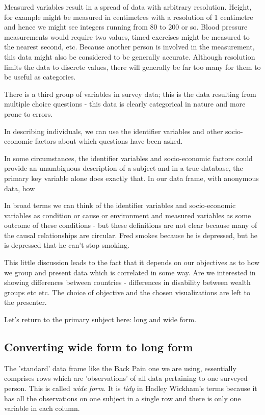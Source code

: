 \documentclass[titlepage]{book}\usepackage{knitr}
\begin{document}
Measured variables result in a spread of data with arbitrary resolution.  Height, for example might be measured in centimetres with a resolution of 1 centimetre and hence we might see integers running from 80 to 200 or so. Blood pressure measurements would require two values, timed exercises might be measured to the nearest second, etc.  Because another person is involved in the measurement, this data might also be considered to be generally accurate. Although resolution limits the data to discrete values, there will generally be far too many for them to be useful as categories.

There is a third group of variables in survey data; this is the data resulting from multiple choice questions - this data is clearly categorical in nature and more prone to errors.  

In describing individuals, we can use the identifier variables and other socio-economic factors about which questions have been asked. 

In some circumstances, the identifier variables and socio-economic factors could provide an unambiguous description of a subject and in a true database, the primary key variable alone does exactly that. In our data frame, with anonymous data,  how

In broad terms we can think of the identifier variables and socio-economic variables as condition or cause or environment and measured variables as some outcome of these conditions - but these definitions are not clear because many of the causal relationships are circular. Fred smokes because he is depressed, but he is depressed that he can't stop smoking.

This little discussion leads to the fact that it depends on our objectives as to how we group and present data which is correlated in some way. Are we interested in showing differences between countries - differences in disability between wealth groups etc etc.  The choice of objective and the chosen visualizations are left to the presenter.

Let's return to the primary subject here: long and wide form.

\subsection{Converting wide form to long form} \label{widetolong}

 The 'standard' data frame like the Back Pain one we are using, essentially comprises rows which are 'observations' of all data pertaining to one surveyed person. This is called \textsl{wide form}. It is \textsl{tidy} in Hadley Wickham's terms because it has all the observations on one subject in a single row and there is only one variable in each column. 
\end{document}
